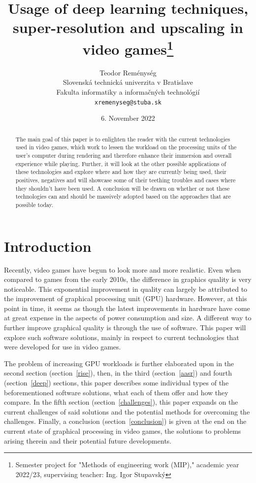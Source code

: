 \documentclass[10pt,oneside,english,a4paper]{article}
\title{Usage of deep learning techniques, super-resolution and upscaling in video games\thanks{Semester project for "Methods of engineering work (MIP)," academic year 2022/23, supervising teacher: Ing. Igor Stupavský}}
\author{Teodor Reménység\\[2pt]
	{\small Slovenská technická univerzita v Bratislave}\\
	{\small Fakulta informatiky a informačných technológií}\\
	{\small \texttt{xremenyseg@stuba.sk}}
	}
\date{\small 6. November 2022}
\begin{document}
\maketitle

\begin{abstract}
The main goal of this paper is to enlighten the reader with the current technologies used in video games, which work to lessen the workload on the processing units of the user’s computer during rendering and therefore enhance their immersion and overall experience while playing. Further, it will look at the other possible applications of these technologies and explore where and how they are currently being used, their positives, negatives and will showcase some of their teething troubles and cases where they shouldn’t have been used. A conclusion will be drawn on whether or not these technologies can and should be massively adopted based on the approaches that are possible today.
\end{abstract}



\section{Introduction}

Recently, video games have begun to look more and more realistic. Even when compared to games from the early 2010s, the difference in graphics quality is very noticeable. This exponential improvement in quality can largely be attributed to the improvement of graphical processing unit (GPU) hardware. However, at this point in time, it seems as though the latest improvements in hardware have come at great expense in the aspects of power consumption and size. A different way to further improve graphical quality is through the use of software. This paper will explore such software solutions, mainly in respect to current technologies that were developed for use in video games.

The problem of increasing GPU workloads is further elaborated upon in the second section (section~\ref{rise}), then, in the third (section~\ref{aasr}) and fourth (section~\ref{deep}) sections, this paper describes some individual types of the beforementioned software solutions, what each of them offer and how they compare. In the fifth section (section~\ref{challenges}), this paper expands on the current challenges of said solutions and the potential methods for overcoming the challenges. Finally, a conclusion (section~\ref{conclusion}) is given at the end on the current state of graphical processing in video games, the solutions to problems arising therein and their potential future developments.
\end{document}

